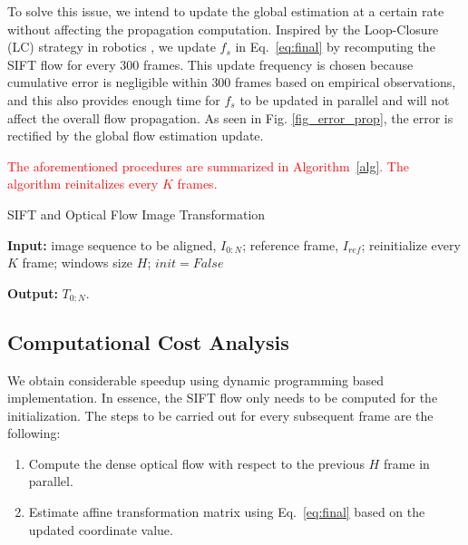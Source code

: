 \documentclass[review]{elsarticle}
\newcommand{\Songfan}[1]{\textcolor{red}{#1}}
\begin{document}
To solve this issue, we intend to update the global estimation at a certain rate without affecting the propagation computation. Inspired by the Loop-Closure (LC) strategy in robotics \cite{close_loop_icra_05}, we update $f_s$ in Eq.~\eqref{eq:final} by recomputing the SIFT flow for every $300$ frames. This update frequency is chosen because cumulative error is negligible within $300$ frames based on empirical observations, and this also provides enough time for $f_s$ to be updated in parallel and will not affect the overall flow propagation. As seen in Fig. \ref{fig_error_prop}, the error is rectified by the global flow estimation update. 

\Songfan{The aforementioned procedures are summarized in Algorithm~\ref{alg}. The algorithm reinitalizes every $K$ frames.}

\begin{algorithm}[htb]
	\caption{SIFT and Optical Flow Image Transformation}
	\textbf{Input:} image sequence to be aligned, $I_{0:N}$; reference frame, $I_{ref}$; reinitialize every $K$ frame; windows size $H$; $init=False$\\
	\begin{algorithmic}[1]
		\EndIf
		\Else
		\EndFor
		\EndIf
		\EndFor
	\end{algorithmic}
	\textbf{Output:} $T_{0:N}$. \\
	\label{alg}
\end{algorithm}

\subsection{\label{sec:time}Computational Cost Analysis}
We obtain considerable speedup using dynamic programming based implementation. In essence, the SIFT flow only needs to be computed for the initialization. The steps to be carried out for every subsequent frame are the following:
\begin{enumerate}
	\item Compute the dense optical flow with respect to the previous $H$ frame in parallel.
	\item Estimate affine transformation matrix using Eq.~\eqref{eq:final} based on the updated coordinate value.
\end{enumerate}
\end{document}

